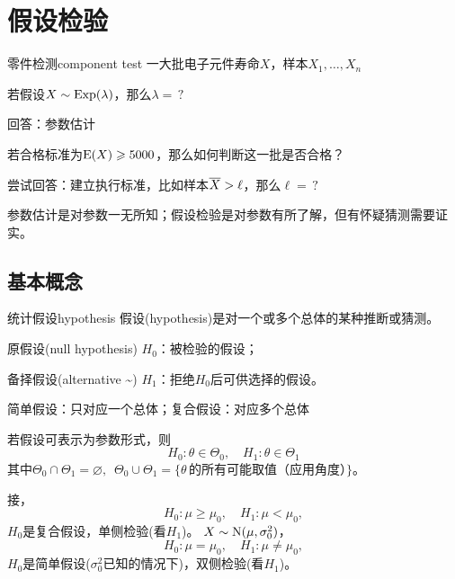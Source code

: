 \chapter{假设检验}
\begin{example}{零件检测}{component test}
	一大批电子元件寿命$X$，样本$X_1,\ldots,X_n$
	\begin{compactenum}
		\item 若假设$X\sim\operatorname{Exp}(\lambda)$，那么$\lambda=\,?$

		回答：参数估计
		\item 若合格标准为$\operatorname{E}(X)\geqslant 5000$，那么如何判断这一批是否合格？
		
		尝试回答：建立执行标准，比如样本$\overline{X}>\ell$，那么$\ell=\,?$

	\end{compactenum}
\end{example}
参数估计是对参数一无所知；假设检验是对参数有所了解，但有怀疑猜测需要证实。
\section{基本概念}
\begin{definition}{统计假设}{hypothesis}
	假设(hypothesis)是对一个或多个总体的某种推断或猜测。
	\begin{compactitem}
		\item 原假设(null hypothesis) $H_0$：被检验的假设；
		\item 备择假设(alternative \textasciitilde) $H_1$：拒绝$H_0$后可供选择的假设。
	\end{compactitem}
	简单假设：只对应一个总体；复合假设：对应多个总体
\end{definition}
若假设可表示为参数形式，则
\[
	H_0:\theta\in\varTheta_0,\quad H_1:\theta\in\varTheta_1
\]
其中$\varTheta_0\cap\varTheta_1=\varnothing,\enspace\varTheta_0\cup\varTheta_1=\{\theta\,\text{的所有可能取值（应用角度）\}}$。
\begin{example}{}{}
	接，
	\[
		H_0:\mu\geqslant\mu_0,\quad H_1:\mu<\mu_0,
	\]
	$H_0$是复合假设，单侧检验(看$H_1$)。
	\tcblower
	$X\sim\operatorname{N}(\mu,\sigma_0^2)$，
	\[
		H_0:\mu=\mu_0,\quad H_1:\mu\neq\mu_0,
	\]
	$H_0$是简单假设($\sigma_0^2$已知的情况下)，双侧检验(看$H_1$)。
\end{example}

